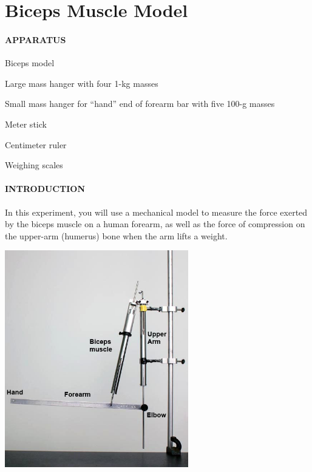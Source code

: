 
\vspace{-5ex}\part*{Biceps Muscle Model}

\subsection*{APPARATUS}

\vspace{-0.5ex}
\vphantom{.}
\squishlist
\item Biceps model
\item Large mass hanger with four 1-kg masses
\item Small mass hanger for ``hand'' end of forearm bar with five 100-g masses
\item Meter stick
\item Centimeter ruler
\item Weighing scales
\squishend

\subsection*{INTRODUCTION}

In this experiment, you will use a mechanical model to measure the force exerted by the biceps muscle on a human forearm, as well as the force of compression on the upper-arm (humerus) bone when the arm lifts a weight.
\begin{center} \includegraphics*[width=0.6\textwidth]{imgs/6labs/6Alab/6Aexp6/6a-exp6_fig1_text_fix.jpg} \end{center}

